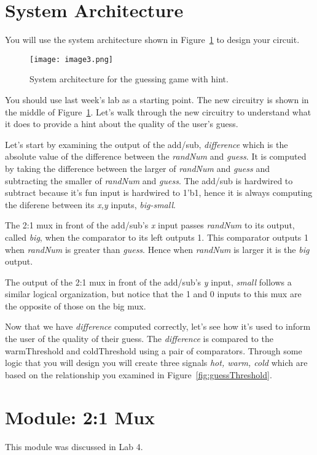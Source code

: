 \section{System Architecture}
You will use the system
architecture shown in Figure~\ref{fig:guessWithHintSystemArch} to
design your circuit.


\begin{figure}[ht]
\texttt{[image:  image3.png]}
\caption{System architecture for the guessing game with hint. }
\label{fig:guessWithHintSystemArch}
\end{figure}

You should use last week's lab as a starting point. The new circuitry is shown in the middle of 
Figure~\ref{fig:guessWithHintSystemArch}.  Let's walk through the new circuitry
to understand what it does to provide a hint about the quality of the user's guess.

Let's start by examining the output of the add/sub, \emph{difference} which is the absolute 
value of the difference between the \emph{randNum} and \emph{guess}.  It is computed 
by taking the difference between the larger of \emph{randNum} and \emph{guess} and 
subtracting the smaller of \emph{randNum} and \emph{guess}.  The add/sub is hardwired
to subtract because it's fun input is hardwired to 1'b1, hence it is always computing the
diferene between its \emph{x,y} inputs, \emph{big-small}.

The 2:1 mux in front of the add/sub's \emph{x} input passes \emph{randNum} to its 
output, called \emph{big}, when the comparator to its left outputs 1.  This comparator 
outputs 1 when \emph{randNum} is greater than \emph{guess}.  Hence when \emph{randNum}
is larger it is the \emph{big} output.

The output of the 2:1 mux in front of the add/sub's \emph{y} input, \emph{small} follows
a similar logical organization, but notice that the 1 and 0 inputs to this mux are the
opposite of those on the big mux.

Now that we have \emph{difference} computed correctly, let's see how it's used
to inform the user of the quality of their guess. The
\emph{difference} is compared to the warmThreshold and coldThreshold
using a pair of comparators. Through some logic that you will design you
will create three signals \emph{hot, warm, cold} which are based on the
relationship you examined in Figure~\ref{fig:guessThreshold}.

\section{Module: 2:1 Mux}
This module was discussed in Lab 4.

